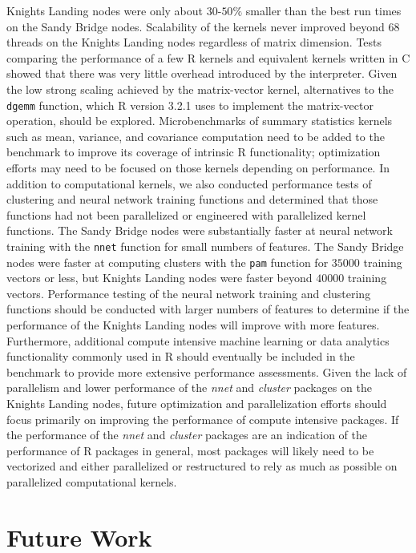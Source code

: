   Knights Landing nodes were only about $30$-$50\%$ smaller than the best run
  times on the Sandy Bridge nodes.
Scalability of the kernels never improved beyond $68$ threads on the Knights
  Landing nodes regardless of matrix dimension.
Tests comparing the performance of a few R kernels and equivalent kernels
  written in C showed that there was very little overhead introduced by the
  interpreter.
Given the low strong scaling achieved by the matrix-vector kernel, alternatives
  to the \texttt{dgemm} function, which R version 3.2.1 uses to implement the
  matrix-vector operation, should be explored.
Microbenchmarks of summary statistics kernels such as mean, variance, and
  covariance computation need to be added to the benchmark to improve its
  coverage of intrinsic R functionality; optimization efforts may need to be
  focused on those kernels depending on performance.
In addition to computational kernels, we also conducted performance tests of
  clustering and neural network training functions and determined that those
  functions had not been parallelized or engineered with parallelized kernel
  functions.
The Sandy Bridge nodes were substantially faster at neural network training with  the \texttt{nnet} function for small numbers of features.
The Sandy Bridge nodes were faster at computing clusters with the \texttt{pam}
  function for $35000$ training vectors or less, but Knights Landing nodes were
  faster beyond $40000$ training vectors.
Performance testing of the neural network training and clustering functions
  should be conducted with larger numbers of features to determine if the
  performance of the Knights Landing nodes will improve with more features.
Furthermore, additional compute intensive machine learning or data analytics
  functionality commonly used in R should eventually be included in the
  benchmark to provide more extensive performance assessments.
Given the lack of parallelism and lower performance of the \textit{nnet} and
  \textit{cluster} packages on the Knights Landing nodes, future optimization
  and parallelization efforts should focus primarily on improving the
  performance of compute intensive packages.
If the performance of the \textit{nnet} and \textit{cluster} packages are an
  indication of the performance of R packages in general, most packages will
  likely need to be vectorized and either parallelized or restructured to rely
  as much as possible on parallelized computational kernels.


\section{Future Work}

%
